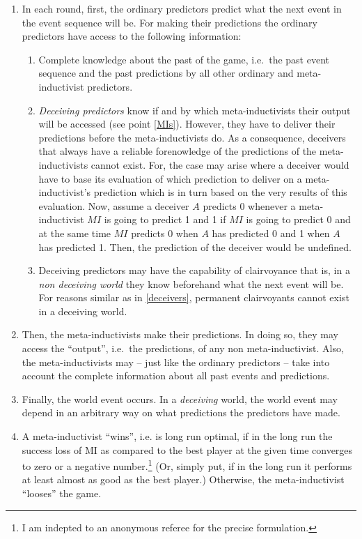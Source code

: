 \documentclass[12pt, a4paper]{article}
\numberwithin{equation}{section}
\begin{document}
\begin{enumerate}

  \item In each round, first, the ordinary predictors predict
  what the next event in the event sequence will be. For making their
  predictions the ordinary predictors have access to the following information:

  \begin{enumerate}
    \item Complete knowledge about the past of the game, i.e.~the past event
    sequence and the past predictions by all other ordinary and
    meta-inductivist predictors.

    \item \label{deceivers}{\em Deceiving predictors} know if and by which
    meta-inductivists their output will be accessed (see point \ref{MIs}). 
    However, they have to deliver their predictions before the
    meta-inductivists do. As a consequence, deceivers that always
    have a reliable forenowledge of the predictions of the meta-inductivists cannot
    exist. For, the case may arise where a deceiver would have to base its
    evaluation of which prediction to deliver on a meta-inductivist's prediction
    which is in turn based on the very results of this evaluation. Now, assume a
    deceiver $A$ predicts 0 whenever a meta-inductivist $MI$ is going to predict
    1 and 1 if $MI$ is going to predict 0 and at the same time $MI$ predicts 0
    when $A$ has predicted 0 and 1 when $A$ has predicted 1. Then, the prediction of
    the deceiver would be undefined.
    
    \item Deceiving predictors may have the capability of clairvoyance that is,
    in a {\em non deceiving world} they know beforehand what the next event will
    be. For reasons similar as in \ref{deceivers}, permanent clairvoyants
    cannot exist in a deceiving world.
  \end{enumerate}
  
  \item \label{MIs} Then, the meta-inductivists make their predictions. In doing
  so, they may access the ``output'', i.e.~the predictions, of any non
  meta-inductivist. Also, the meta-inductivists may -- just like the ordinary
  predictors -- take into account the complete information about all past events
  and predictions.
  
  \item \label{world} Finally, the world event occurs. In a {\em deceiving}
  world, the world event may depend in an arbitrary way on what predictions the
  predictors have made.

  \item A meta-inductivist ``wins'', i.e. is long run optimal, if in the long run
  the success loss of MI as compared to the best player at the given time
  converges to zero or a negative number.\footnote{I am indepted to an anonymous
  referee for the precise formulation.} (Or, simply put, if in the long run it
  performs at least almost as good as the best player.) Otherwise, the
  meta-inductivist ``looses'' the game.
 
\end{enumerate}
\end{document}

